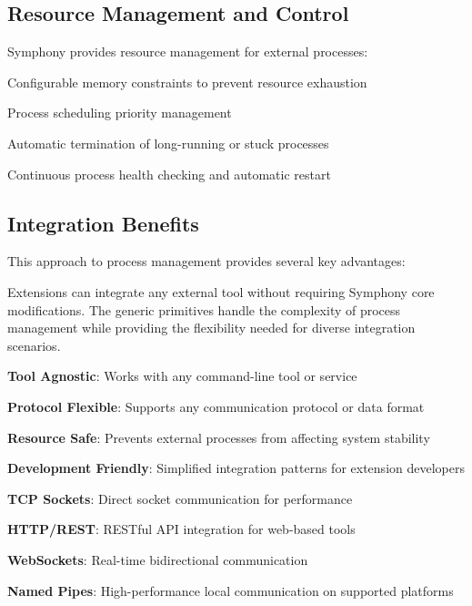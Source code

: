 \subsection*{Resource Management and Control}

Symphony provides resource management for external processes:

\begin{description}[leftmargin=3cm,labelwidth=2.5cm]
    \item[\textbf{Memory Limits}] Configurable memory constraints to prevent resource exhaustion
    \item[\textbf{CPU Priority}] Process scheduling priority management
    \item[\textbf{Timeout Control}] Automatic termination of long-running or stuck processes
    \item[\textbf{Health Monitoring}] Continuous process health checking and automatic restart
\end{description}

\subsection*{Integration Benefits}

This approach to process management provides several key advantages:

\begin{successbox}
Extensions can integrate any external tool without requiring Symphony core modifications. The generic primitives handle the complexity of process management while providing the flexibility needed for diverse integration scenarios.
\end{successbox}

\begin{compactlist}
    \item \textbf{Tool Agnostic}: Works with any command-line tool or service
    \item \textbf{Protocol Flexible}: Supports any communication protocol or data format
    \item \textbf{Resource Safe}: Prevents external processes from affecting system stability
    \item \textbf{Development Friendly}: Simplified integration patterns for extension developers
\end{compactlist}

\begin{compactlist}
    \item \textbf{TCP Sockets}: Direct socket communication for performance
    \item \textbf{HTTP/REST}: RESTful API integration for web-based tools
    \item \textbf{WebSockets}: Real-time bidirectional communication
    \item \textbf{Named Pipes}: High-performance local communication on supported platforms
\end{compactlist}

